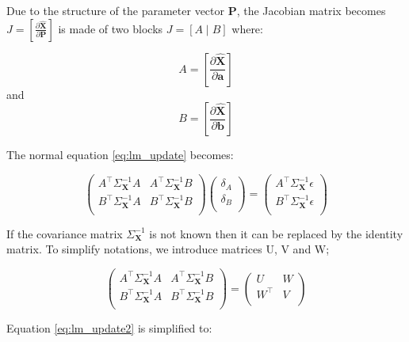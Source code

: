 \documentclass[11pt]{report}
\begin{document}
Due to the structure of the parameter vector $\mathbf{P}$, the Jacobian matrix becomes $J = \left [ \frac{\partial\widehat{\mathbf{X}}}{\partial \mathbf{P}} \right ]$ is made of two blocks $J=\left [ A\mid B\right ]$ where:

\[
A = \left [ \frac{\partial\widehat{\mathbf{X}}}{\partial\mathbf{a}}\right ]
\]
and
\[
B = \left [ \frac{\partial\widehat{\mathbf{X}}}{\partial\mathbf{b}}\right ]
\]

The normal equation \ref{eq:lm_update} becomes: 

\begin{equation}
    \label{eq:lm_update2}
    \left ( 
    \begin{matrix}
        A^\top\Sigma^{-1}_{\mathbf{X}}A &  A^\top\Sigma^{-1}_{\mathbf{X}}B \\
        B^\top\Sigma^{-1}_{\mathbf{X}}A &  B^\top\Sigma^{-1}_{\mathbf{X}}B \\
    \end{matrix}
    \right )
    \left (
    \begin{matrix}
      \delta_A \\
      \delta_B \\
    \end{matrix}
    \right )
    =
    \left (
    \begin{matrix}
        A^\top\Sigma^{-1}_{\mathbf{X}}\epsilon \\
        B^\top\Sigma^{-1}_{\mathbf{X}}\epsilon \\
    \end{matrix}
    \right )
\end{equation}

If the covariance matrix $\Sigma^{-1}_{\mathbf{X}}$ is not known then it can be replaced by the identity matrix. To simplify notations, we introduce matrices U, V and W;

\[
    \left ( 
    \begin{matrix}
        A^\top\Sigma^{-1}_{\mathbf{X}}A &  A^\top\Sigma^{-1}_{\mathbf{X}}B \\
        B^\top\Sigma^{-1}_{\mathbf{X}}A &  B^\top\Sigma^{-1}_{\mathbf{X}}B \\
    \end{matrix}
    \right )
=
\left (
  \begin{matrix}
      U & W \\
      W^\top & V \\
  \end{matrix}
\right )
\]

Equation \ref{eq:lm_update2} is simplified to:
\end{document}
